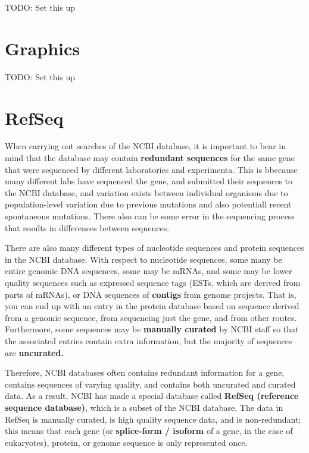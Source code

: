 \documentclass[
]{book}
\begin{document}
TODO: Set this up

\hypertarget{graphics}{%
\section{Graphics}\label{graphics}}

TODO: Set this up

\hypertarget{refseq}{%
\section{RefSeq}\label{refseq}}

When carrying out searches of the NCBI database, it is important to bear in mind that the database may contain \textbf{redundant sequences} for the same gene that were sequenced by different laboratories and experimenta. This is bbecause many different labs have sequenced the gene, and submitted their sequences to the NCBI database, and variation exists between individual organisms due to population-level variation due to previous mutations and also potentiall recent spontaneous mutations. There also can be some error in the sequencing process that results in differences between sequences.

There are also many different types of nucleotide sequences and protein sequences in the NCBI database. With respect to nucleotide sequences, some many be entire genomic DNA sequences, some may be mRNAs, and some may be lower quality sequences such as expressed sequence tags (ESTs, which are derived from parts of mRNAs), or DNA sequences of \textbf{contigs} from genome projects. That is, you can end up with an entry in the protein database based on sequence derived from a genomic sequence, from sequencing just the gene, and from other routes. Furthermore, some sequences may be \textbf{manually curated} by NCBI staff so that the associated entries contain extra information, but the majority of sequences are \textbf{uncurated.}

Therefore, NCBI databases often contains redundant information for a gene, contains sequences of varying quality, and contains both uncurated and curated data. As a result, NCBI has made a special database called \textbf{RefSeq (reference sequence database)}, which is a subset of the NCBI database. The data in RefSeq is manually curated, is high quality sequence data, and is non-redundant; this means that each gene (or \textbf{splice-form / isoform} of a gene, in the case of eukaryotes), protein, or genome sequence is only represented once.
\end{document}
